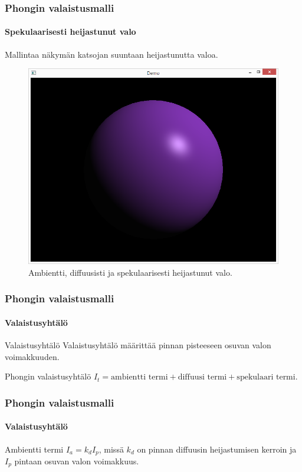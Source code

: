 \documentclass{beamer}
\begin{document}
\begin{frame}
\frametitle{Phongin valaistusmalli}
\framesubtitle{Spekulaarisesti heijastunut valo}
Mallintaa näkymän katsojan suuntaan heijastunutta valoa.
\begin{figure}
\includegraphics[scale=0.3]{img/sphere_ambient_diffuse_specular.png}
\caption{Ambientti, diffuusisti ja spekulaarisesti heijastunut valo.}
\end{figure}
\end{frame}

\begin{frame}
\frametitle{Phongin valaistusmalli}
\framesubtitle{Valaistusyhtälö}
\begin{block}{Valaistusyhtälö}
Valaistusyhtälö määrittää pinnan pisteeseen osuvan valon voimakkuuden.
\end{block}
\begin{block}{Phongin valaistusyhtälö}
$I_t = \text{ambientti termi}+ \text{diffuusi termi} + \text{spekulaari termi}$.
\end{block}
\end{frame}

\begin{frame}
\frametitle{Phongin valaistusmalli}
\framesubtitle{Valaistusyhtälö}
\begin{block}{Ambientti termi}
$I_a = k_dI_p$, missä
$k_d$ on pinnan diffuusin heijastumisen kerroin ja $I_p$ pintaan osuvan valon voimakkuus.
\end{block}
\end{frame}
\end{document}
